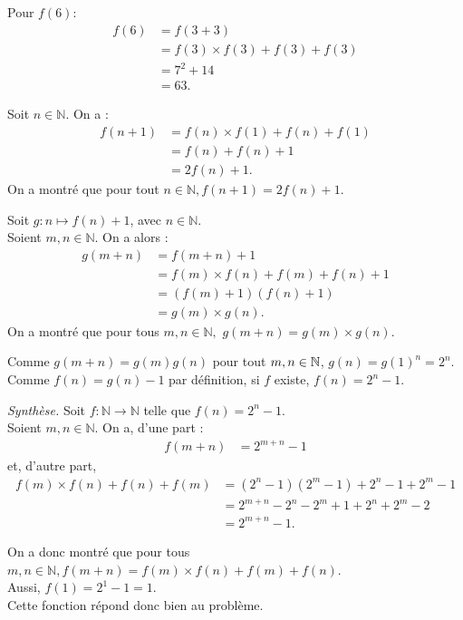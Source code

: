 \documentclass[]{../templates/homework}
\begin{document}
Pour $f(6)$:
\begin{align*}
	f(6) &= f(3+3) \\
	&= f(3) \times f(3) + f(3) + f(3) \\
	&= 7^2 + 14 \\
	&= 63.
\end{align*}

\question Soit $n \in \mathbb{N}$. On a :
\begin{align*}
	f(n+1) &= f(n) \times f(1) + f(n) + f(1) \\
	&= f(n) + f(n) + 1 \\
	&= 2f(n) + 1.
\end{align*}
On a montré que pour tout $n \in \mathbb{N}, f(n+1) = 2f(n)+1$.

\question Soit $g:n \mapsto f(n)+1$, avec $n \in \mathbb{N}$.\\
Soient $m, n \in \mathbb{N}$. On a alors :
\begin{align*}
	g(m+n) &= f(m+n) + 1 \\
	&= f(m) \times f(n) + f(m) + f(n) + 1 \\
	&= (f(m) + 1)(f(n) + 1) \\
	&= g(m) \times g(n).
\end{align*}
On a montré que pour tous $m, n \in \mathbb{N},$ $g(m+n) = g(m) \times g(n)$.

\question Comme $g(m+n) = g(m)g(n)$ pour tout $m,n \in \mathbb N$, $g(n) = g(1)^n = 2^n$. Comme $f(n) = g(n) - 1$ par définition, si $f$ existe, $f(n) = 2^n -1$.

\textit{Synthèse.}
Soit $f:\mathbb{N} \to \mathbb{N}$ telle que $f(n) = 2^n - 1.$ \\
Soient $m, n \in \mathbb{N}$. On a, d'une part :
\begin{align*}
	f(m+n) &= 2^{m+n} - 1
\end{align*}
et, d'autre part,
\begin{align*}
	f(m) \times f(n) + f(n) + f(m) &= (2^{n} - 1)(2^{m} - 1) + 2^{n} - 1 + 2^{m} - 1 \\
	&= 2^{m+n} - 2^n - 2^m + 1 + 2^{n} + 2^{m} - 2 \\
	&= 2^{m+n} - 1.
\end{align*}

On a donc montré que pour tous $m, n \in \mathbb{N}, f(m+n) = f(m) \times f(n) + f(m) + f(n)$.\\
Aussi, $f(1) = 2^1 - 1 = 1$.\\
Cette fonction répond donc bien au problème.
\end{document}
